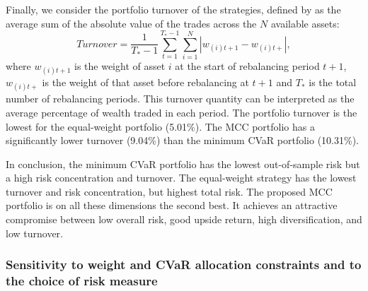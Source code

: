\documentclass[12pt,a4paper]{article}
\begin{document}

Finally, we consider the portfolio turnover of the strategies, defined by \citet{DeMiguel2009} as the average sum of the absolute value of the trades across the $N$ available assets:
\begin{equation} Turnover = \frac{1}{T_*-1} \sum_{t=1}^{T_*-1} \sum_{i=1}^N | w_{(i)t+1}-w_{(i)t+} |,
\label{eq:turnover} \end{equation}
where $w_{(i)t+1}$ is the weight of asset $i$ at the start of rebalancing period $t+1$, $w_{(i)t+}$ is the weight of that asset before rebalancing at $t+1$ and $T_*$ is the total number of rebalancing periods. This turnover quantity can be interpreted as the average percentage of wealth traded in each period. The portfolio turnover is the lowest for the equal-weight portfolio (5.01\%).  The MCC portfolio has a significantly lower turnover (9.04\%) than the minimum CVaR portfolio (10.31\%).

	In conclusion, the minimum CVaR portfolio has the lowest out-of-sample risk but a high risk concentration and turnover. The equal-weight strategy has the lowest turnover and risk concentration, but highest total risk. The proposed MCC portfolio is on all these dimensions the second best. It achieves an attractive compromise between low overall risk, good upside return, high diversification, and low turnover.

\clearpage

\subsubsection{Sensitivity to weight and CVaR allocation constraints and to the choice of risk measure}
\end{document}
